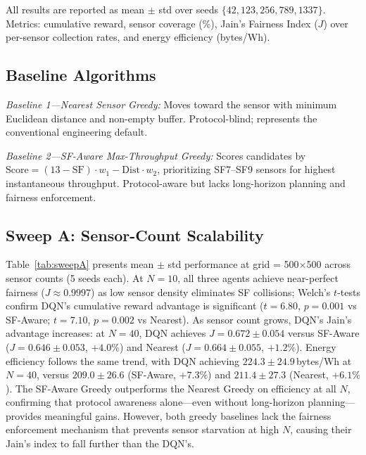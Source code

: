 \documentclass[conference]{IEEEtran}
\begin{document}
All results are reported as mean $\pm$ std over seeds $\{42, 123, 256, 789, 1337\}$. Metrics: cumulative reward, sensor coverage (\%), Jain's Fairness Index ($J$) over per-sensor collection rates, and energy efficiency (bytes/Wh).

\subsection{Baseline Algorithms}

\textit{Baseline 1---Nearest Sensor Greedy:} Moves toward the sensor with minimum Euclidean distance and non-empty buffer. Protocol-blind; represents the conventional engineering default.

\textit{Baseline 2---SF-Aware Max-Throughput Greedy:} Scores candidates by $\text{Score} = (13 - \text{SF}) \cdot w_1 - \text{Dist} \cdot w_2$, prioritizing SF7--SF9 sensors for highest instantaneous throughput. Protocol-aware but lacks long-horizon planning and fairness enforcement.

\subsection{Sweep A: Sensor-Count Scalability}

Table~\ref{tab:sweepA} presents mean $\pm$ std performance at grid = 500$\times$500 across sensor counts (5 seeds each). At $N=10$, all three agents achieve near-perfect fairness ($J \approx 0.9997$) as low sensor density eliminates SF collisions; Welch's $t$-tests confirm DQN's cumulative reward advantage is significant ($t=6.80$, $p=0.001$ vs SF-Aware; $t=7.10$, $p=0.002$ vs Nearest). As sensor count grows, DQN's Jain's advantage increases: at $N=40$, DQN achieves $J=0.672\pm0.054$ versus SF-Aware ($J=0.646\pm0.053$, $+4.0\%$) and Nearest ($J=0.664\pm0.055$, $+1.2\%$). Energy efficiency follows the same trend, with DQN achieving $224.3\pm24.9$\,bytes/Wh at $N=40$, versus $209.0\pm26.6$ (SF-Aware, $+7.3\%$) and $211.4\pm27.3$ (Nearest, $+6.1\%$). The SF-Aware Greedy outperforms the Nearest Greedy on efficiency at all $N$, confirming that protocol awareness alone---even without long-horizon planning---provides meaningful gains. However, both greedy baselines lack the fairness enforcement mechanism that prevents sensor starvation at high $N$, causing their Jain's index to fall further than the DQN's.
\end{document}
